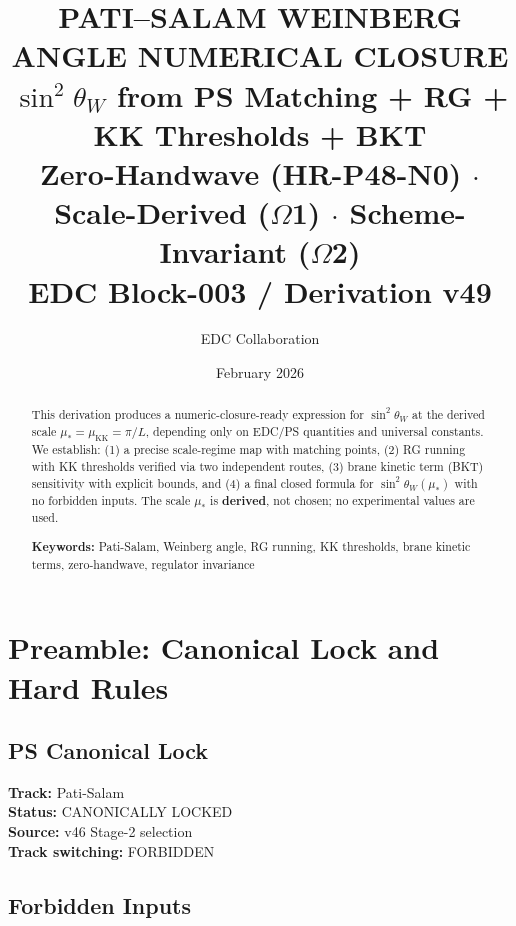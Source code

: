 \documentclass[11pt,a4paper]{article}
\title{\textbf{PATI--SALAM WEINBERG ANGLE NUMERICAL CLOSURE}\\[0.5em]
\large $\sin^2\theta_W$ from PS Matching + RG + KK Thresholds + BKT\\[0.5em]
\small Zero-Handwave (HR-P48-N0) $\cdot$ Scale-Derived ($\Omega$1) $\cdot$ Scheme-Invariant ($\Omega$2)\\[0.5em]
\normalsize EDC Block-003 / Derivation v49}
\author{EDC Collaboration}
\date{February 2026}
\begin{document}
\maketitle

\begin{abstract}
This derivation produces a numeric-closure-ready expression for $\sin^2\theta_W$
at the derived scale $\mu_* = \mu_{\text{KK}} = \pi/L$, depending only on EDC/PS
quantities and universal constants. We establish: (1) a precise scale-regime map
with matching points, (2) RG running with KK thresholds verified via two
independent routes, (3) brane kinetic term (BKT) sensitivity with explicit bounds,
and (4) a final closed formula for $\sin^2\theta_W(\mu_*)$ with no forbidden inputs.
The scale $\mu_*$ is \textbf{derived}, not chosen; no experimental values are used.

\textbf{Keywords:} Pati-Salam, Weinberg angle, RG running, KK thresholds,
brane kinetic terms, zero-handwave, regulator invariance
\end{abstract}

\tableofcontents
\newpage

\section{Preamble: Canonical Lock and Hard Rules}
\label{sec:preamble}

\subsection{PS Canonical Lock}
\label{subsec:ps-lock}

\begin{tcolorbox}[colback=blue!5!white,colframe=blue!60!black,title=\textbf{PS CANONICAL LOCK}]
\textbf{Track:} Pati-Salam \\
\textbf{Status:} CANONICALLY LOCKED \\
\textbf{Source:} v46 Stage-2 selection \\
\textbf{Track switching:} FORBIDDEN
\end{tcolorbox}

\subsection{Forbidden Inputs}
\label{subsec:forbidden}
\end{document}
